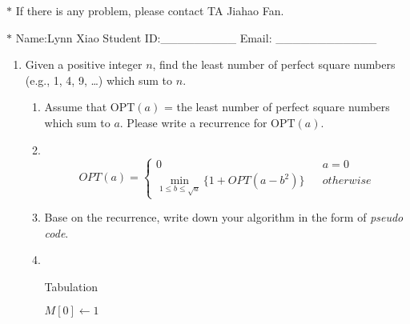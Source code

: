 \documentclass[12pt,a4paper]{article}
\makeatletter
\newtheorem*{solution}{Solution}
\theoremstyle{definition}
\renewenvironment{solution}[1][Solution] {\par\pushQED{\qed}\normalfont\topsep6\p@\@plus6\p@\relax\trivlist\item[\hskip\labelsep\bfseries#1\@addpunct{.}]\ignorespaces}{\popQED\endtrivlist\@endpefalse} \makeatother
\makeatother
\begin{document}
\noindent

\noindent{}
\begin{center}
\footnotesize{\color{red}$*$ If there is any problem, please contact TA Jiahao Fan.}

\footnotesize{\color{blue}$*$ Name:Lynn Xiao  \quad Student ID:\_\_\_\_\_\_\_\_\_ \quad Email: \_\_\_\_\_\_\_\_\_\_\_\_}
\end{center}

\begin{enumerate}
    \item
    Given a positive integer $n$, find the least number of perfect square numbers (e.g., 1, 4, 9, \dots) which sum to $n$.
    \begin{enumerate}
        \item
        Assume that $\text{OPT}(a)$ = the least number of perfect square numbers which sum to $a$. Please write a recurrence for $\text{OPT}(a)$.
		\begin{solution}
			~\\
			$$ OPT(a)=\left\{
			\begin{array}{lcl}
			0       &      & {a      =      0}\\
		\min_{1\le b\le\sqrt{a}} \{1+OPT(a-b^2)\}     &      & {otherwise}
			\end{array} \right. $$
		\end{solution}
        \item
        Base on the recurrence, write down your algorithm in the form of \emph{pseudo code}.
        
        \begin{solution}
        	~\\
        \begin{minipage}[t]{0.9\textwidth}
        	\begin{algorithm}[H]
        		\BlankLine
        		\caption{Tabulation}
        		\label{Alg-selectionsort}
        		\BlankLine
        		$M[0]\leftarrow1$\;
        		

\end{algorithm}
\end{minipage}
\end{solution}
\end{enumerate}
\end{enumerate}
\end{document}
